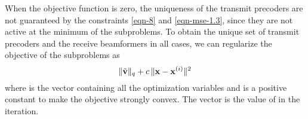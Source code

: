 When the objective function is zero, the uniqueness of the transmit precoders are not guaranteed by the constraints \eqref{eqn-8} and \eqref{eqn-mse-1.3}, since they are not active at the minimum of the subproblems. To obtain the unique set of transmit precoders and the receive beamformers in all cases, we can regularize the objective of the subproblems as 
\begin{equation}
\| \tilde{\mathbf{v}} \|_q + c \, \| \mathbf{x} - \mathbf{x}^{(i)} \|^2
\end{equation}
where  is the vector containing all the optimization variables and  is a positive constant to make the objective strongly convex. The vector  is the value of  in the  iteration. %

